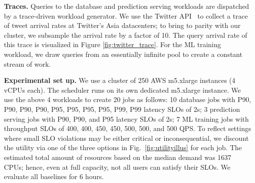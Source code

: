 \textbf{Traces.} Queries to the database and prediction serving workloads
 are dispatched by a trace-driven workload generator.
We
use the Twitter API~\cite{twitter2020} to collect a trace of tweet arrival rates at Twitter's Asia datacenters;
to bring to parity with our cluster, we subsample the arrival rate by a factor
of 10. The query arrival rate of this trace is visualized in Figure \ref{fig:twitter_trace}.
For the ML training workload, we draw queries from an essentially infinite pool to create a constant
stream of work.
\insertFigTwitterTrace





\textbf{Experimental set up.}
We use a cluster of  250 AWS m5.xlarge instances (4 vCPUs each).
The \cilantro{} scheduler runs on its own dedicated m5.xlarge instance.
We use the above 4 workloads to create 20 jobs as follows:
10 database jobs with P90, P90, P90, P90, P95, P95, P95, P95, P99, P99 latency SLOs of 2s;
3 prediction serving jobs  with P90, P90, and P95 latency SLOs of 2s;
7 ML training jobs  with throughput SLOs of 400, 400, 450, 450, 500, 500, and
500 QPS.
To reflect settings where small SLO violations may be either critical or inconsequential,
we discount the utility via one of the three options in Fig.~\ref{fig:utilityillus} for each job.
The estimated total amount of resources based on the median demand was 1637 CPUs;
hence, even at full capacity, not all users can satisfy their SLOs.
We evaluate all baselines for 6 hours.



